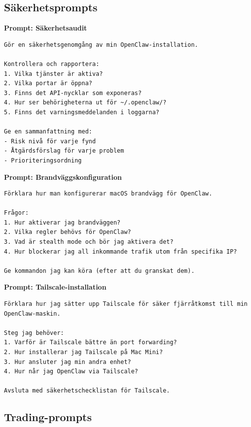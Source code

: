 \documentclass[12pt,a4paper,swedish]{article}
\begin{document}
\subsection{Säkerhetsprompts}
\label{sec:sakerhet-prompts}

\bigskip

\textbf{Prompt: Säkerhetsaudit}
\begin{lstlisting}[style=latex]
Gör en säkerhetsgenomgång av min OpenClaw-installation.

Kontrollera och rapportera:
1. Vilka tjänster är aktiva?
2. Vilka portar är öppna?
3. Finns det API-nycklar som exponeras?
4. Hur ser behörigheterna ut för ~/.openclaw/?
5. Finns det varningsmeddelanden i loggarna?

Ge en sammanfattning med:
- Risk nivå för varje fynd
- Åtgärdsförslag för varje problem
- Prioriteringsordning
\end{lstlisting}

\bigskip

\textbf{Prompt: Brandväggskonfiguration}
\begin{lstlisting}[style=latex]
Förklara hur man konfigurerar macOS brandvägg för OpenClaw.

Frågor:
1. Hur aktiverar jag brandväggen?
2. Vilka regler behövs för OpenClaw?
3. Vad är stealth mode och bör jag aktivera det?
4. Hur blockerar jag all inkommande trafik utom från specifika IP?

Ge kommandon jag kan köra (efter att du granskat dem).
\end{lstlisting}

\bigskip

\textbf{Prompt: Tailscale-installation}
\begin{lstlisting}[style=latex]
Förklara hur jag sätter upp Tailscale för säker fjärråtkomst till min OpenClaw-maskin.

Steg jag behöver:
1. Varför är Tailscale bättre än port forwarding?
2. Hur installerar jag Tailscale på Mac Mini?
3. Hur ansluter jag min andra enhet?
4. Hur når jag OpenClaw via Tailscale?

Avsluta med säkerhetschecklistan för Tailscale.
\end{lstlisting}

\subsection{Trading-prompts}
\label{sec:trading-prompts}

\bigskip
\end{document}

